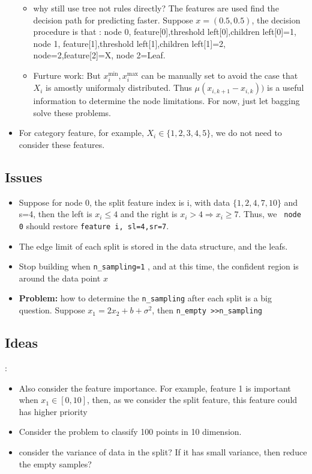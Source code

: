 \documentclass[11pt,onecolumn]{IEEEtran}
\begin{document}
\begin{itemize}
\begin{figure}[h]
    \end{figure}
\begin{itemize}
    \item why still use tree not rules directly? The features are used  find the decision path for predicting faster. Suppose $x=(0.5,0.5)$, the decision procedure is that : node 0, feature[0],threshold left[0],children left[0]=1, node 1, feature[1],threshold left[1],children left[1]=2, node=2,feature[2]=X, node 2=Leaf. 
    \item  Furture work:  But $x_i^{\mbox{min}},x_i^{\mbox{max}}$ can be manually set to avoid the case that $X_i$ is amostly uniformaly distributed. Thus $\mu(x_{i,k+1}-x_{i,k}))$ is a useful information to determine the node limitations. For now, just let bagging solve these problems.
\end{itemize}
 

\item For category feature, for example, $X_i\in\{1,2,3,4,5\}$, we do not need to consider these features.


\end{itemize}



\subsection{Issues}
\begin{itemize}
	\item Suppose for node 0, the split feature index is i, with data $\{1,2,4,7,10\}$ and s=4, then the left is $x_i\leq 4$ and the right is $x_i>4\Rightarrow x_i\geq 7$. Thus, we \texttt{ node 0} should restore  \texttt{feature i, sl=4,sr=7}.
	\item The edge limit of each split is stored in the data structure, and the leafs.
    \item Stop  building when  \texttt{n\_sampling=1} , and at this time, the confident region is around the data point $x$
    \item \textbf{Problem:} how to determine the \texttt{n\_sampling}  after each split is a big question.  Suppose $x_1=2 x_2+b+\sigma^2$, then \texttt{n\_empty >>n\_sampling} 
\end{itemize}



\subsection{Ideas}:
\begin{itemize}
	\item  Also consider the feature importance. For example, feature 1 is important when $x_1\in[0,10]$, then, as we consider the split feature, this feature could has higher priority
	\item Consider the problem to classify 100 points in 10 dimension.
    \item consider the variance of data in the split?  If it has small variance, then reduce the empty samples?
\end{itemize}
\end{document}
